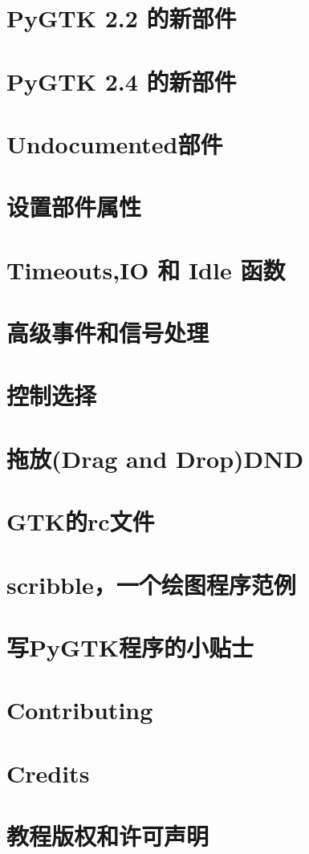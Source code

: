 \documentclass[a4paper,12pt]{book}%
\begin{document}
	\chapter{PyGTK 2.2 的新部件}
	\chapter{PyGTK 2.4 的新部件}
	\chapter{Undocumented部件}
	\chapter{设置部件属性}
	\chapter{Timeouts,IO 和 Idle 函数}
	\chapter{高级事件和信号处理}
	\chapter{控制选择}
	\chapter{拖放(Drag and Drop)DND}
	\chapter{GTK的rc文件}
	\chapter{scribble，一个绘图程序范例}
	\chapter{写PyGTK程序的小贴士}
	\chapter{Contributing}
	\chapter{Credits}
	\chapter{教程版权和许可声明}
	\appendix
\end{document}
